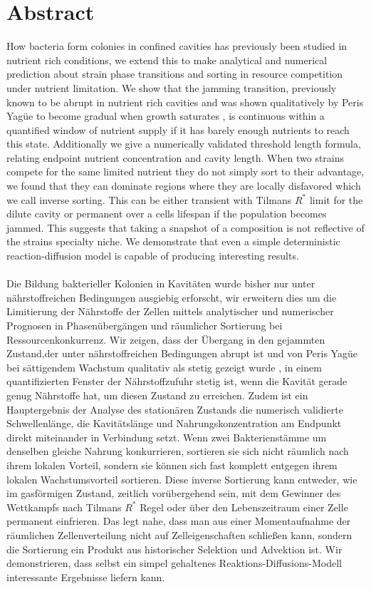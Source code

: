\documentclass[11pt,a4paper]{report}
\begin{document}
	\chapter*{Abstract}
	How bacteria form colonies in confined cavities has previously been studied in nutrient rich conditions, we extend this to make analytical and numerical prediction about strain phase transitions and sorting in resource competition under nutrient limitation. We show that the jamming transition, previously known to be abrupt in nutrient rich cavities \cite{Karita} and was shown qualitatively by Peris Yagüe to become gradual when growth saturates \cite{peris}, is continuous within a quantified window of nutrient supply if it has barely enough nutrients to reach this state. Additionally we give a numerically validated threshold length formula, relating endpoint nutrient concentration and cavity length. When two strains compete for the same limited nutrient they do not simply sort to their advantage, we found that they can dominate regions where they are locally disfavored which we call inverse sorting. This can be either transient with Tilmans $R^*$ \cite{rstar} limit for the dilute cavity or permanent over a cells lifespan if the population becomes jammed. This suggests that taking a snapshot of a composition is not reflective of the strains specialty niche. We demonstrate that even a simple deterministic reaction-diffusion model is capable of producing interesting results.\\
	\\
	Die Bildung bakterieller Kolonien in Kavitäten wurde bisher nur unter nährstoffreichen Bedingungen ausgiebig erforscht, wir erweitern dies um die Limitierung der Nährstoffe der Zellen mittels analytischer und numerischer Prognosen in Phasenübergängen und räumlicher Sortierung bei Ressourcenkonkurrenz. Wir zeigen, dass der Übergang in den gejammten Zustand,der unter nährstoffreichen Bedingungen abrupt ist \cite{Karita} und von Peris Yagüe bei sättigendem Wachstum qualitativ als stetig gezeigt wurde \cite{peris}, in einem quantifizierten Fenster der Nährstoffzufuhr stetig ist, wenn die Kavität gerade genug Nährstoffe hat, um diesen Zustand zu erreichen. Zudem ist ein Hauptergebnis der Analyse des stationären Zustands die numerisch validierte Schwellenlänge, die Kavitätslänge und Nahrungskonzentration am Endpunkt direkt miteinander in Verbindung setzt. Wenn zwei Bakterienstämme um denselben gleiche Nahrung konkurrieren, sortieren sie sich nicht räumlich nach ihrem lokalen Vorteil, sondern sie können sich fast komplett entgegen ihrem lokalen Wachstumsvorteil sortieren. Diese inverse Sortierung kann entweder, wie im gasförmigen Zustand, zeitlich vorübergehend sein, mit dem Gewinner des Wettkampfs nach Tilmans $R^*$ Regel \cite{rstar} oder über den Lebenszeitraum einer Zelle permanent einfrieren. Das legt nahe, dass man aus einer Momentaufnahme der räumlichen Zellenverteilung nicht auf Zelleigenschaften schließen kann, sondern die Sortierung ein Produkt aus historischer Selektion und Advektion ist. Wir demonstrieren, dass selbst ein simpel gehaltenes Reaktions-Diffusions-Modell interessante Ergebnisse liefern kann.
	\tableofcontents
\end{document}
